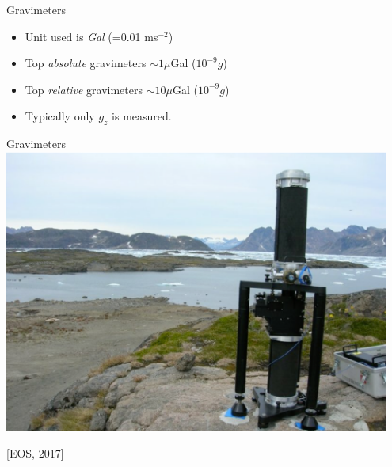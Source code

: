 \begin{frame}
  \begin{PointSix}{Gravimeters}
    \begin{itemize}
      \item Unit used is \textit{Gal} (=0.01 ms$^{-2}$)
      \item Top \textit{absolute} gravimeters $\sim 1 \mu$Gal ($10^{-9} g$)
      \item Top \textit{relative} gravimeters $\sim 10 \mu$Gal ($10^{-9} g$)
      \item Typically only $g_z$ is measured.
    \end{itemize}
  \end{PointSix}
\end{frame}

\begin{frame}
  \begin{PointSix}{Gravimeters}
    \includegraphics[width=0.95\textwidth]{Figures/Gravity/Exported/AbsolutGravimeter_EOS2017.png}

    \tiny [EOS, 2017]
  \end{PointSix}
\end{frame}

